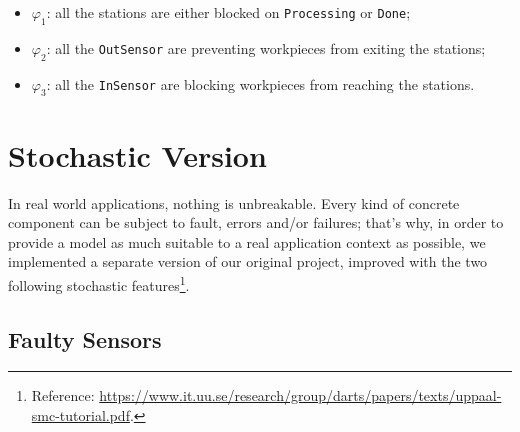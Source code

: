 \documentclass[a4paper,twoside]{article}
\begin{document}
    \begin{itemize}
        \item \(\varphi_1\): all the stations are either blocked on \texttt{Processing} or \texttt{Done};
        \item \(\varphi_2\): all the \texttt{OutSensor} are preventing workpieces from exiting the stations;
        \item \(\varphi_3\): all the \texttt{InSensor} are blocking workpieces from reaching the stations.
    \end{itemize}

    \section{S\lowercase{tochastic} V\lowercase{ersion}}

    In real world applications, nothing is unbreakable. Every kind of concrete component can be subject to fault, errors and/or failures; that's why, in order to provide a model as much suitable to a real application context as possible, we implemented a separate version of our original project, improved with the two following stochastic features\footnote{Reference: \textsf{\hyperlink{https://www.it.uu.se/research/group/darts/papers/texts/uppaal-smc-tutorial.pdf}{https://www.it.uu.se/research/group/darts/papers/texts/uppaal-smc-tutorial.pdf}}.}.

    \subsection{Faulty Sensors}
\end{document}
